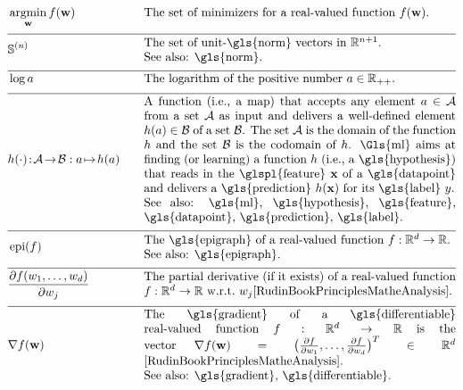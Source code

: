 \newpage
\begin{align}
    &\argmin_{\weights} f(\weights) &\quad &\mbox{The set of minimizers for a real-valued function $f(\weights)$.  } \nonumber \\[2mm] \hline \nonumber\\[-5mm]
    &\sphere{\nrnodes} &\quad &\parbox{.75\textwidth}{The set of unit-\gls{norm} vectors in $\mathbb{R}^{\nrnodes+1}$.
    	\\ See also: \gls{norm}. }\nonumber \\[2mm] \hline \nonumber\\[-5mm]
	 &\log a &\quad &\mbox{The logarithm of the positive number $a \in \mathbb{R}_{++}$.  } \nonumber \\[2mm] \hline \nonumber\\[-5mm]
	 &\hypothesis(\cdot)\!:\!\mathcal{A}\!\rightarrow\!\mathcal{B} :  a \!\mapsto\!h(a) &\quad &\parbox{.75\textwidth}{
	 	A function (i.e., a map) that accepts any element $a \in \mathcal{A}$ from a set $\mathcal{A}$ 
	 	as input and delivers a well-defined element $\hypothesis(a) \in \mathcal{B}$ of a set $\mathcal{B}$. 
	 	The set $\mathcal{A}$ is the domain of the function $\hypothesis$ and the set $\mathcal{B}$ is the 
	 	codomain of $\hypothesis$. \Gls{ml} aims at finding (or learning) a function $\hypothesis$ (i.e., a \gls{hypothesis}) 
	 	that reads in the \glspl{feature} $\featurevec$ of a \gls{datapoint} and delivers a \gls{prediction} $\hypothesis(\featurevec)$
	 	for its \gls{label} $\truelabel$.
		\\ See also: \gls{ml}, \gls{hypothesis}, \gls{feature}, \gls{datapoint}, \gls{prediction}, \gls{label}.} \nonumber \\[2mm] \hline \nonumber\\[-5mm]
	 &\operatorname{epi}(f)  & \quad & \parbox{.75\textwidth}{The \gls{epigraph} of a real-valued function 
	 	$f: \mathbb{R}^{\featuredim}\rightarrow \mathbb{R}$.
		\\ See also: \gls{epigraph}. } \nonumber \\[2mm]  \hline \nonumber\\[-5mm]
	 &  \frac{\partial f(\weight_{1},\ldots,\weight_{\nrfeatures})}{\partial \weight_{\featureidx}} & \quad & \parbox{.75\textwidth}{The partial derivative (if it exists) of 
	 		a real-valued function $f: \mathbb{R}^{\featuredim}\rightarrow \mathbb{R}$ w.r.t.\ $\weight_{\featureidx}$\cite[Ch. 9]{RudinBookPrinciplesMatheAnalysis}.
			} \nonumber \\[2mm] \hline \nonumber\\[-5mm]
	 &\nabla f(\weights) & \quad & \parbox{.75\textwidth}{The \gls{gradient} of a \gls{differentiable} real-valued function 
	 	$f: \mathbb{R}^{\featuredim}\rightarrow \mathbb{R}$ is the vector 
	 	$\nabla f(\weights) = \big( \frac{\partial f}{\partial \weight_{1}},\ldots,\frac{\partial f}{\partial \weight_{\featuredim}}  \big)^{T} \in \mathbb{R}^{\featuredim}$ \cite[Ch. 9]{RudinBookPrinciplesMatheAnalysis}.
		\\ See also: \gls{gradient}, \gls{differentiable}.}   \nonumber
\end{align} 
